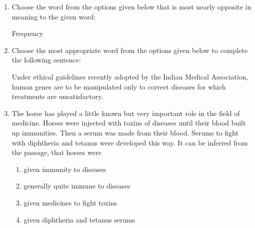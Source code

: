 \documentclass[a4paper, 11pt]{article}
\begin{document}
\begin{enumerate}
    \hfill{}

    \item Choose the word from the options given below that is most nearly opposite in meaning to the given word:
    
    Frequency
    
    \begin{enumerate}
    \end{enumerate}
    
    \hfill{}

    \item Choose the most appropriate word from the options given below to complete the following sentence:
    
    Under ethical guidelines recently adopted by the Indian Medical Association, human genes are to be manipulated only to correct diseases for which \underline{\hspace{2cm}} treatments are unsatisfactory.
    
    \begin{enumerate}
    \end{enumerate}
    
    \hfill{}

    \item The horse has played a little known but very important role in the field of medicine. Horses were injected with toxins of diseases until their blood built up immunities. Then a serum was made from their blood. Serums to fight with diphtheria and tetanus were developed this way. It can be inferred from the passage, that horses were
    
    \begin{enumerate}
        \item given immunity to diseases
        \item generally quite immune to diseases
        \item given medicines to fight toxins
        \item given diphtheria and tetanus serums
    \end{enumerate}
    

\end{enumerate}
\end{document}
